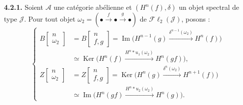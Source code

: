 \medskip\noindent\textbf{4.2.1.}\quad
Soient $\mathcal A$ une catégorie abélienne et $(H^n(f),\delta)$ un objet
spectral de type $\mathcal J$. Pour tout objet
$\omega_2=(\mathord\bullet\xrightarrow f\mathord\bullet\xrightarrow g\mathord\bullet)$
de $\mathcal{F}\ell_2(\mathcal J)$, posons :
\[
\left\{
\begin{aligned}
B\!\left[\begin{smallmatrix}n\\\omega_2\end{smallmatrix}\right]
&=B\!\left[\begin{smallmatrix}n\\f,g\end{smallmatrix}\right]
=\operatorname{Im}\bigl(H^{n-1}(g)
  \xrightarrow{\delta^{n-1}(\omega_2)}H^n(f)\bigr)\\
&\simeq\operatorname{Ker}\bigl(H^n(f)
  \xrightarrow{H^n*u_1(\omega_2)}H^n(gf)\bigr),\\[2pt]
Z\!\left[\begin{smallmatrix}n\\\omega_2\end{smallmatrix}\right]
&=Z\!\left[\begin{smallmatrix}n\\f,g\end{smallmatrix}\right]
=\operatorname{Ker}\bigl(H^n(g)
  \xrightarrow{\delta^n(\omega_2)}H^{n+1}(f)\bigr)\\
&\simeq\operatorname{Im}\bigl(H^n(gf)
  \xrightarrow{H^n*u_2(\omega_2)}H^n(g)\bigr).
\end{aligned}
\right.
\tag{4.2.1.1}
\]
\endgroup
